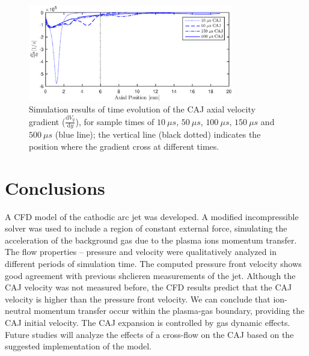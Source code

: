 \documentclass[a4paper]{iacas}%
\begin{document}
\begin{figure}
	\centering
	\includegraphics[width=0.8\textwidth]{CAJAcceleration.eps}
	\caption{Simulation results of time evolution of the CAJ axial velocity gradient ($\frac{\mathrm{d}V_y}{\mathrm{d}y}$), for sample times of $10~\mu s$, $50~\mu s$, $100~\mu s$, $150~\mu s$ and $500~\mu s$ (blue line); the vertical line (black dotted) indicates the position where the gradient cross at different times. }
	\label{fig:model_caj_acceleration}
\end{figure}
\section{Conclusions}
A CFD model of the cathodic arc jet was developed.
A modified incompressible solver was used to include a region of constant external force, simulating the acceleration of the background gas due to the plasma ions momentum transfer.
The flow properties -- pressure and velocity were qualitatively analyzed in different periods of simulation time. The computed pressure front velocity shows good agreement with previous shclieren measurements of the jet. Although the CAJ velocity was not measured before, the CFD results predict that the CAJ velocity is higher than the pressure front velocity.
We can conclude that ion-neutral momentum transfer occur within the plasma-gas boundary, providing the CAJ initial velocity. The CAJ expansion is controlled by gas dynamic effects. 
Future studies will analyze the effects of a cross-flow on the CAJ based on the suggested implementation of the model.

\clearpage


\end{document}
